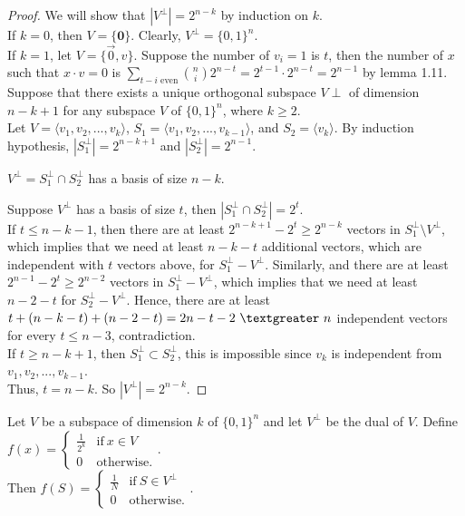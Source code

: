 \begin{proof}
We will show that $|V^\perp| = 2^{n-k}$ by induction on $k$.\\
If $k=0$, then $V = \{ \textbf{0}\}$. Clearly, $V^\perp = \{ 0, 1 \}^n$. \\
If $k=1$, let $V = \{ \vec{0}, v \}$. 
Suppose the number of $v_i = 1$ is $t$, 
then the number of $x$ such that $x \cdot v = 0$ is 
$\sum \limits_{t-i \text{ even}} {n \choose i} 2^{n-t} =
2^{t-1} \cdot 2^{n-t} = 2^{n-1}$ by lemma 1.11. \\
Suppose that there exists a unique orthogonal subspace $V\perp$ 
of dimension $n-k+1$ for any subspace $V$ of $\{ 0,1 \}^n$, where $k \geq 2$. \\
Let $V=\langle v_1, v_2,..., v_{k} \rangle$, 
$S_1 = \langle v_1, v_2,..., v_{k-1}\rangle$, 
and $S_2 = \langle v_{k}\rangle$. 
By induction hypothesis, $|S_1^\perp| = 2^{n-k+1}$ 
and $|S_2^\perp| = 2^{n-1}$. 
\begin{claim}
$V^\perp = S_1^\perp \cap S_2^\perp$ has a basis of size $n-k$.
\end{claim}
\noindent Suppose $V^\perp$ has a basis of size $t$, 
then $|S_1^\perp \cap S_2^\perp| = 2^t$.  \\
If $t \leq n-k-1$, then there are at least 
$2^{n-k+1} - 2^t \geq 2^{n-k} $ vectors in $S_1^\perp \setminus V^\perp$, 
which implies that we need at least $n-k-t$ additional vectors,
which are independent with $t$ vectors above, for $S_1^\perp - V^\perp$. 
Similarly, and there are at least $2^{n-1} - 2^t \geq 2^{n-2}$ 
vectors in $S_1^\perp - V^\perp$, which implies that we need at
least $n-2-t$ for $S_2^\perp - V^\perp$. 
Hence, there are at least $t + (n-k-t) + (n-2-t) = 2n - t -2\ \textgreater \ n$  independent vectors for every $t \leq n - 3 $, contradiction.\\
If $t \geq n-k+1$, then $S_1^\perp \subset S_2^\perp$,
this is impossible since $v_k$ is independent from $v_1, v_2, ..., v_{k-1}$. \\
Thus, $t = n-k$. So $|V^\perp| = 2^{n-k}$. 
\end{proof}

\begin{theorem}
Let $V$ be a subspace of dimension $k$ of $\{ 0, 1 \}^n$ and let $V^\perp$ be the dual of $V$. Define \\
 $f(x) =
\begin{cases}
	\frac{1}{2^k} & \text{if} \ x \in V \\
	0             & \text{otherwise}.
\end{cases}$. \\
Then
$\hat{f}(S) =
\begin{cases}
	\frac{1}{N} & \text{if} \ S \in V^\perp \\
	0             & \text{otherwise}.
\end{cases}$.
\end{theorem}


